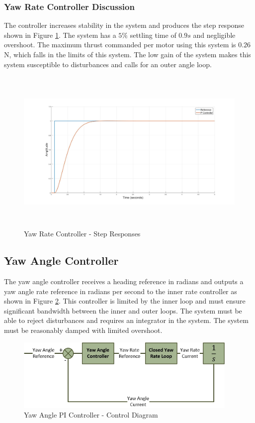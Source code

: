 		\subsubsection{Yaw Rate Controller Discussion}
		The controller increases stability in the system and produces the step response shown in Figure \ref{IM_YawRateStep}. The system has a $5\% $ settling time of $0.9s$ and negligible overshoot. The maximum thrust commanded per motor using this system is $0.26$\,N, which falls in the limits of this system. The low gain of the system makes this system susceptible to disturbances and calls for an outer angle loop. 
					
		\begin{figure}[H]
			\centering
			\includegraphics[height = 8cm]{../Design/Matlab/Controllers/yaw_rate_step.jpg}
			\caption{Yaw Rate Controller -  Step Responses}
			\label{IM_YawRateStep}
		\end{figure}
		
	\subsection{Yaw Angle Controller}	
	The yaw angle controller receives a heading reference in radians and outputs a yaw angle rate reference in radians per second to the inner rate controller as shown in Figure \ref{IM_YawAngleLoop}. This controller is limited by the inner loop and must ensure significant bandwidth between the inner and outer loops. The system must be able to reject disturbances and requires an integrator in the system. The system must be reasonably damped  with limited overshoot.

	\begin{figure}[H]
		\centering
		\includegraphics[height = 3.5cm]{../References/Diagrams/YawAngleLoop.jpg}
		\caption{Yaw Angle PI Controller -  Control Diagram}
		\label{IM_YawAngleLoop}
	\end{figure}
	
